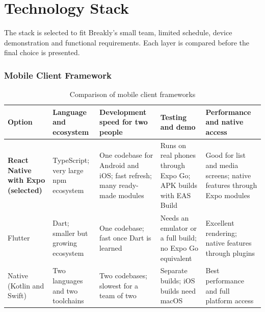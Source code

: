 \section{Technology Stack}
\label{sec:technology-stack}

The stack is selected to fit Breakly's small team, limited schedule, device
demonstration and functional requirements. Each layer is compared before the
final choice is presented.

\subsubsection{Mobile Client Framework}

\begingroup
\footnotesize
\begin{longtable}{|>{\raggedright\arraybackslash}p{2.6cm}|>{\raggedright\arraybackslash}p{2.95cm}|>{\raggedright\arraybackslash}p{2.95cm}|>{\raggedright\arraybackslash}p{2.95cm}|>{\raggedright\arraybackslash}p{2.95cm}|}
\caption{Comparison of mobile client frameworks}\label{tab:tech-mobile}\\
\hline
\textbf{Option} & \textbf{Language and ecosystem} & \textbf{Development speed for two people} & \textbf{Testing and demo} & \textbf{Performance and native access} \\ \hline
\textbf{React Native with Expo (selected)} & TypeScript; very large npm ecosystem &

One codebase for Android and iOS; fast refresh; many ready-made modules &

Runs on real phones through Expo Go; APK builds with EAS Build &

Good for list and media screens; native features through Expo modules \\ \hline

Flutter & Dart; smaller but growing ecosystem &

One codebase; fast once Dart is learned &

Needs an emulator or a full build; no Expo Go equivalent &

Excellent rendering; native features through plugins \\ \hline

Native (Kotlin and Swift) & Two languages and two toolchains &

Two codebases; slowest for a team of two &

Separate builds; iOS builds need macOS &

Best performance and full platform access \\ \hline

\end{longtable}

